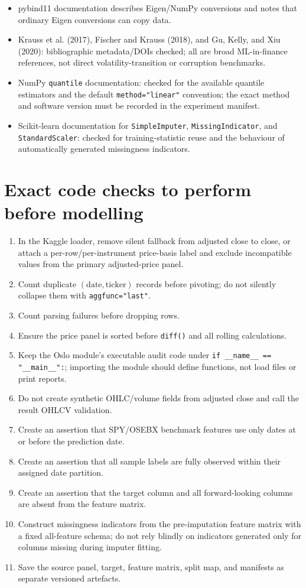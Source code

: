 \documentclass[11pt,a4paper]{article}
\begin{document}
\begin{itemize}
  \item pybind11 documentation describes Eigen/NumPy conversions and notes that ordinary Eigen conversions can copy data.
  \item Krauss et al. (2017), Fischer and Krauss (2018), and Gu, Kelly, and Xiu (2020): bibliographic metadata/DOIs checked; all are broad ML-in-finance references, not direct volatility-transition or corruption benchmarks.
  \item NumPy \texttt{quantile} documentation: checked for the available quantile estimators and the default \texttt{method="linear"} convention; the exact method and software version must be recorded in the experiment manifest.
  \item Scikit-learn documentation for \texttt{SimpleImputer}, \texttt{MissingIndicator}, and \texttt{StandardScaler}: checked for training-statistic reuse and the behaviour of automatically generated missingness indicators.
\end{itemize}

\section{Exact code checks to perform before modelling}
\label{app:codechecks}

\begin{enumerate}
  \item In the Kaggle loader, remove silent fallback from adjusted close to close, or attach a per-row/per-instrument price-basis label and exclude incompatible values from the primary adjusted-price panel.
  \item Count duplicate $(\text{date},\text{ticker})$ records before pivoting; do not silently collapse them with \texttt{aggfunc="last"}.
  \item Count parsing failures before dropping rows.
  \item Ensure the price panel is sorted before \texttt{diff()} and all rolling calculations.
  \item Keep the Oslo module's executable audit code under \verb|if __name__ == "__main__":|; importing the module should define functions, not load files or print reports.
  \item Do not create synthetic OHLC/volume fields from adjusted close and call the result OHLCV validation.
  \item Create an assertion that SPY/OSEBX benchmark features use only dates at or before the prediction date.
  \item Create an assertion that all sample labels are fully observed within their assigned date partition.
  \item Create an assertion that the target column and all forward-looking columns are absent from the feature matrix.
  \item Construct missingness indicators from the pre-imputation feature matrix with a fixed all-feature schema; do not rely blindly on indicators generated only for columns missing during imputer fitting.
  \item Save the source panel, target, feature matrix, split map, and manifests as separate versioned artefacts.
\end{enumerate}
\end{document}
